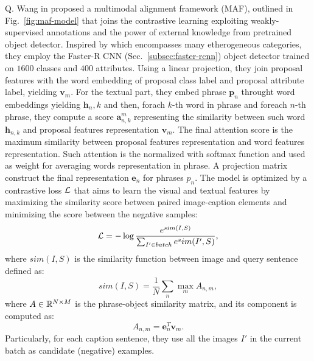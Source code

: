 Q. Wang \etal{} in \cite{wang2020maf} proposed a multimodal alignment
framework (MAF), outlined in Fig.~\ref{fig:maf-model} that joins the
contrastive learning exploiting weakly-supervised annotations and the
power of external knowledge from pretrained object detector. Inspired
by \cite{wang2019phrase} which encompasses many etherogeneous
categories, they employ the Faster-R CNN
(Sec.~\ref{subsec:faster-rcnn}) object detector trained on $1600$
classes and $400$ attributes. Using a linear projection, they join
proposal features with the word embedding of proposal class label and
proposal attribute label, yielding $\bm{v}_m$. For the textual part,
they embed phrase $\bm{p}_n$ throught word embeddings yielding
$\bm{h}_n,k$ and then, forach $k$-th word in phrase and foreach $n$-th
phrase, they compute a score $\bm{a}^m_{n,k}$ representing the
similarity between such word $\bm{h}_{n,k}$ and proposal features
representation $\bm{v}_m$. The final attention score is the maximum
similarity between proposal features representation and word features
representation. Such attention is the normalized with softmax function
and used as weight for averaging words representation in phrase. A
projection matrix construct the final representation $\bm{e}_n$ for
phrases $p_n$. The model is optimized by a contrastive loss $\mathcal{L}$
that aims to learn the visual and textual features by maximizing the
similarity score between paired image-caption elements and minimizing
the score between the negative samples:
\begin{equation}
  \mathcal{L} = - \log \frac{e^{sim(I, S)}}{ \sum_{I' \in batch} e^sim(I', S) },
\end{equation}
where $sim(I, S)$ is the similarity function between image and query
sentence defined as:
\begin{equation}
  sim(I, S) = \frac{1}{N} \sum_n \max_m A_{n,m},
\end{equation}
where $A \in \mathbb{R}^{N \times M}$ is the phrase-object similarity
matrix, and its component is computed as:
\begin{equation}
  A_{n,m} = \bm{e}^T_n \bm{v}_m.
\end{equation}
Particularly, for each caption sentence, they use all the images $I′$
in the current batch as candidate (negative) examples.

